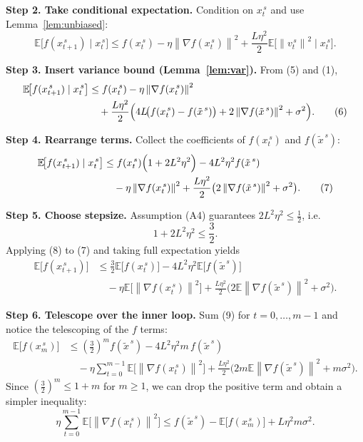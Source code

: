 \documentclass{article}
\newcommand{\E}{\mathbb{E}}
\newcommand{\norm}[1]{\left\|#1\right\|}
\begin{document}
\noindent\textbf{Step 2. Take conditional expectation.}  
Condition on $x_t^{\,s}$ and use Lemma~\ref{lem:unbiased}:
\[
\E\!\bigl[f(x_{t+1}^{\,s})\mid x_t^{\,s}\bigr]
\le f(x_t^{\,s})-\eta\norm{\nabla f(x_t^{\,s})}^{2}
+\frac{L\eta^{2}}{2}\E\!\bigl[\norm{v_t^{\,s}}^{2}\mid x_t^{\,s}\bigr].
\tag{5}
\]

\noindent\textbf{Step 3. Insert variance bound (Lemma~\ref{lem:var}).}  
From (5) and (1),
\[
\begin{aligned}
\E\!\bigl[f(x_{t+1}^{\,s})\mid x_t^{\,s}\bigr]
&\le f(x_t^{\,s})-\eta\norm{\nabla f(x_t^{\,s})}^{2}\\
&\quad+\frac{L\eta^{2}}{2}\Bigl(
4L\!\bigl(f(x_t^{\,s})-f(\tilde{x}^{\,s})\bigr)
+2\norm{\nabla f(\tilde{x}^{\,s})}^{2}
+\sigma^{2}\Bigr).
\tag{6}
\end{aligned}
\]

\noindent\textbf{Step 4. Rearrange terms.}  
Collect the coefficients of $f(x_t^{\,s})$ and $f(\tilde{x}^{\,s})$:
\[
\begin{aligned}
\E\!\bigl[f(x_{t+1}^{\,s})\mid x_t^{\,s}\bigr]
&\le f(x_t^{\,s})\Bigl(1+2L^{2}\eta^{2}\Bigr)
-4L^{2}\eta^{2}f(\tilde{x}^{\,s})\\
&\quad-\eta\norm{\nabla f(x_t^{\,s})}^{2}
+\frac{L\eta^{2}}{2}\bigl(2\norm{\nabla f(\tilde{x}^{\,s})}^{2}+\sigma^{2}\bigr).
\tag{7}
\end{aligned}
\]

\noindent\textbf{Step 5. Choose stepsize.}  
Assumption (A4) guarantees $2L^{2}\eta^{2}\le \frac{1}{2}$, i.e.
\[
1+2L^{2}\eta^{2}\le \frac{3}{2}.
\tag{8}
\]
Applying (8) to (7) and taking full expectation yields
\[
\begin{aligned}
\E\!\bigl[f(x_{t+1}^{\,s})\bigr]
&\le \frac{3}{2}\E\!\bigl[f(x_t^{\,s})\bigr]
-4L^{2}\eta^{2}\E\!\bigl[f(\tilde{x}^{\,s})\bigr]\\
&\quad-\eta\E\!\bigl[\norm{\nabla f(x_t^{\,s})}^{2}\bigr]
+\frac{L\eta^{2}}{2}\bigl(2\E\!\norm{\nabla f(\tilde{x}^{\,s})}^{2}+\sigma^{2}\bigr).
\tag{9}
\end{aligned}
\]

\noindent\textbf{Step 6. Telescope over the inner loop.}  
Sum (9) for $t=0,\dots,m-1$ and notice the telescoping of the $f$ terms:
\[
\begin{aligned}
\E\!\bigl[f(x_{m}^{\,s})\bigr]
&\le \left(\frac{3}{2}\right)^{m}f(\tilde{x}^{\,s})
-4L^{2}\eta^{2}m\,f(\tilde{x}^{\,s})\\
&\quad-\eta\sum_{t=0}^{m-1}\E\!\bigl[\norm{\nabla f(x_t^{\,s})}^{2}\bigr]
+\frac{L\eta^{2}}{2}\bigl(2m\E\!\norm{\nabla f(\tilde{x}^{\,s})}^{2}+m\sigma^{2}\bigr).
\tag{10}
\end{aligned}
\]
Since $\left(\frac{3}{2}\right)^{m}\le 1+ m$ for $m\ge1$, we can drop the positive term and obtain a simpler inequality:
\[
\eta\sum_{t=0}^{m-1}\E\!\bigl[\norm{\nabla f(x_t^{\,s})}^{2}\bigr]
\le f(\tilde{x}^{\,s})- \E\!\bigl[f(x_{m}^{\,s})\bigr]
+L\eta^{2}m\sigma^{2}.
\tag{11}
\]
\end{document}
